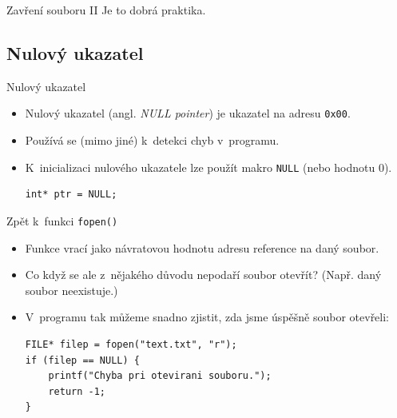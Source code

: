 \documentclass[14pt,aspectratio=169]{beamer}
\begin{document}
    \begin{frame}{Zavření souboru \textrm{II}}
         Je to dobrá praktika. 
    \end{frame}

    \subsection{Nulový ukazatel}
    \begin{frame}[t,fragile]{Nulový ukazatel}
        \begin{itemize}
            \item Nulový ukazatel (angl. \emph{NULL pointer}) je ukazatel na adresu \texttt{0x00}.
            \item Používá se (mimo jiné) k~detekci chyb v~programu.
            \item K~inicializaci nulového ukazatele lze použít makro \texttt{NULL} (nebo hodnotu $0$).
            \begin{lstlisting}
int* ptr = NULL;
            \end{lstlisting}
        \end{itemize}
    \end{frame}

    \begin{frame}[t,fragile]{Zpět k~funkci \texttt{fopen()}}
        \begin{itemize}
            \item Funkce vrací jako návratovou hodnotu adresu reference na daný soubor.
            \item Co když se ale z~nějakého důvodu nepodaří soubor otevřít? (Např. daný soubor neexistuje.)
            \begin{center}
            \end{center}
            \item V~programu tak můžeme snadno zjistit, zda jsme úspěšně soubor otevřeli:
            \begin{lstlisting}
FILE* filep = fopen("text.txt", "r");
if (filep == NULL) {
    printf("Chyba pri otevirani souboru.");
    return -1;
}
            \end{lstlisting}
        \end{itemize}
    \end{frame}
\end{document}
